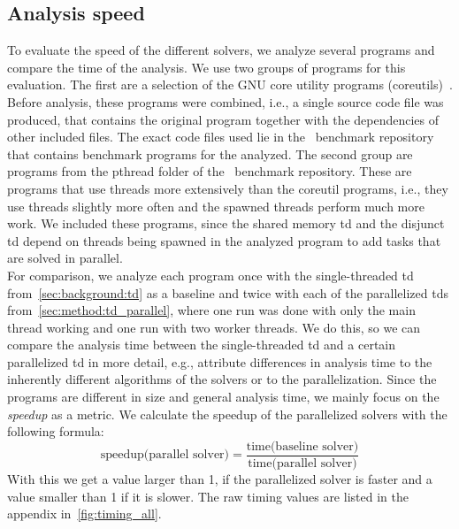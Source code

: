   \subsection{Analysis speed}
  \label{sec:eval:speed}
  To evaluate the speed of the different solvers, we analyze several programs and compare the time of the analysis. We use two groups of programs for this evaluation. The first are a selection of the GNU core utility programs (coreutils)~\cite{gnuCoreutils}. Before analysis, these programs were combined, i.e., a single source code file was produced, that contains the original program together with the dependencies of other included files. The exact code files used lie in the \gob\ benchmark repository~\cite{goblintBench} that contains benchmark programs for the analyzed.
  The second group are programs from the pthread folder of the \gob\ benchmark repository. These are programs that use threads more extensively than the coreutil programs, i.e., they use threads slightly more often and the spawned threads perform much more work. We included these programs, since the shared memory \ac{td} and the disjunct \ac{td} depend on threads being spawned in the analyzed program to add tasks that are solved in parallel.\\
  For comparison, we analyze each program once with the single-threaded \ac{td} from~\autoref{sec:background:td} as a baseline and twice with each of the parallelized \acp{td} from~\autoref{sec:method:td_parallel}, where one run was done with only the main thread working and one run with two worker threads. We do this, so we can compare the analysis time between the single-threaded \ac{td} and a certain parallelized \ac{td} in more detail, e.g., attribute differences in analysis time to the inherently different algorithms of the solvers or to the parallelization. Since the programs are different in size and general analysis time, we mainly focus on the \textit{speedup} as a metric. We calculate the speedup of the parallelized solvers with the following formula:
  \begin{equation*}
    \text{speedup(parallel solver)} = \frac{\text{time(baseline solver)}}{\text{time(parallel solver)}}
  \end{equation*}
  With this we get a value larger than 1, if the parallelized solver is faster and a value smaller than 1 if it is slower. The raw timing values are listed in the appendix in~\autoref{fig:timing_all}.

